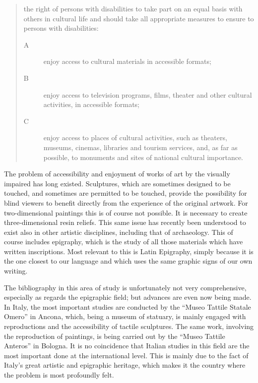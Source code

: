 \documentclass[amsthm,ebook]{saparticle}
\begin{document}
\begin{quotation}
the right of persons with disabilities to take part on an equal basis with others in cultural life and should take all appropriate measures to
ensure to persons with disabilities:

\begin{description}
\item[A] enjoy access to cultural materials in accessible formats;

\item[B] enjoy access to television programs, films, theater and other cultural activities, in accessible formats;

\item[C] enjoy access to places of cultural activities, such as theaters, museums, cinemas, libraries and tourism services,
and, as far as possible, to monuments and sites of national cultural importance.

\end{description}

\end{quotation}
The problem of accessibility and enjoyment of works of art by the visually impaired has long existed. Sculptures, which
are sometimes designed to be touched, and sometimes are permitted to be touched, provide the possibility for blind
viewers to benefit directly from the experience of the original artwork. For two-dimensional paintings this is of
course not possible. It is necessary to create three-dimensional resin reliefs. This same issue has recently been
understood to exist also in other artistic disciplines, including that of archaeology. This of course includes
epigraphy, which is the study of all those materials which have written inscriptions. Most relevant to this is Latin
Epigraphy, simply because it is the one closest to our language and which uses the same graphic signs of our own
writing.

The bibliography in this area of study is unfortunately not very comprehensive, especially as regards the epigraphic
field; but advances are even now being made. In Italy, the most important studies are conducted by the ``Museo Tattile
Statale Omero'' in Ancona, which, being a museum of statuary, is mainly engaged with reproductions and the accessibility
of tactile sculptures. The same work, involving the reproduction of paintings, is being carried out by the ``Museo
Tattile Anteros'' in Bologna. It is no coincidence that Italian studies in this field are the most important done at the
international level. This is mainly due to the fact of Italy’s great artistic and epigraphic heritage, which makes it
the country where the problem is most profoundly felt.
\end{document}
